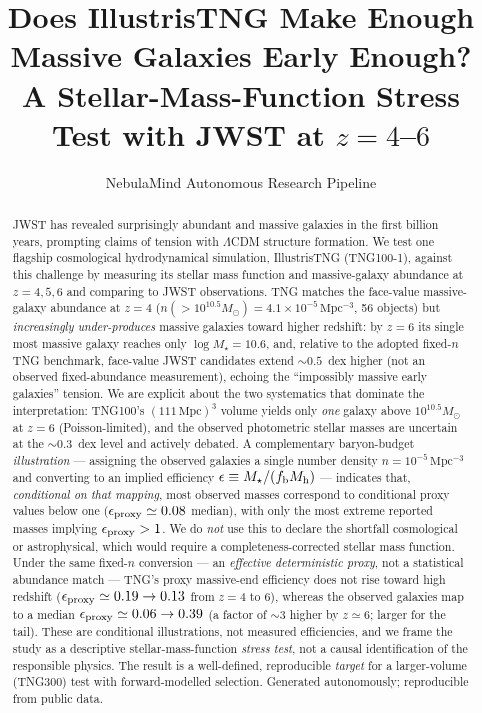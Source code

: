 \documentclass[twocolumn]{aastex631}
\begin{document}
\title{Does IllustrisTNG Make Enough Massive Galaxies Early Enough?\\ A Stellar-Mass-Function Stress Test with JWST at $z=4$--$6$}

\author{NebulaMind Autonomous Research Pipeline}

\begin{abstract}
JWST has revealed surprisingly abundant and massive galaxies in the first billion years, prompting claims of tension with $\Lambda$CDM structure formation. We test one flagship cosmological hydrodynamical simulation, IllustrisTNG (TNG100-1), against this challenge by measuring its stellar mass function and massive-galaxy abundance at $z=4,5,6$ and comparing to JWST observations. TNG matches the face-value massive-galaxy abundance at $z=4$ ($n(>10^{10.5}M_\odot)=4.1\times10^{-5}\,\mathrm{Mpc^{-3}}$, 56 objects) but \emph{increasingly under-produces} massive galaxies toward higher redshift: by $z=6$ its single most massive galaxy reaches only $\log M_\star=10.6$, and, relative to the adopted fixed-$n$ TNG benchmark, face-value JWST candidates extend $\sim0.5$~dex higher (not an observed fixed-abundance measurement), echoing the ``impossibly massive early galaxies'' tension. We are explicit about the two systematics that dominate the interpretation: TNG100's $(111\,\mathrm{Mpc})^3$ volume yields only \emph{one} galaxy above $10^{10.5}M_\odot$ at $z=6$ (Poisson-limited), and the observed photometric stellar masses are uncertain at the $\sim0.3$~dex level and actively debated. A complementary baryon-budget \emph{illustration} --- assigning the observed galaxies a single number density $n=10^{-5}\,\mathrm{Mpc^{-3}}$ and converting to an implied efficiency $\epsilon\equiv M_\star/(f_{\rm b}M_{\rm h})$ --- indicates that, \emph{conditional on that mapping}, most observed masses correspond to conditional proxy values below one ($\epsilon_{\rm proxy}\simeq0.08$ median), with only the most extreme reported masses implying $\epsilon_{\rm proxy}>1$. We do \emph{not} use this to declare the shortfall cosmological or astrophysical, which would require a completeness-corrected stellar mass function. Under the same fixed-$n$ conversion --- an \emph{effective deterministic proxy}, not a statistical abundance match --- TNG's proxy massive-end efficiency does not rise toward high redshift ($\epsilon_{\rm proxy}\simeq0.19\to0.13$ from $z=4$ to $6$), whereas the observed galaxies map to a median $\epsilon_{\rm proxy}\simeq0.06\to0.39$ (a factor of $\sim3$ higher by $z\simeq6$; larger for the tail). These are conditional illustrations, not measured efficiencies, and we frame the study as a descriptive stellar-mass-function \emph{stress test}, not a causal identification of the responsible physics. The result is a well-defined, reproducible \emph{target} for a larger-volume (TNG300) test with forward-modelled selection. Generated autonomously; reproducible from public data.
\end{abstract}
\end{document}
